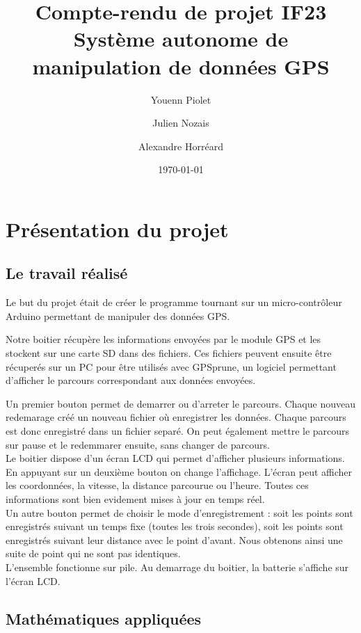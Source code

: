 \documentclass[a4paper,12pt,titlepage]{article}
\title{Compte-rendu de projet IF23\\Système autonome de manipulation de données GPS}
\author{Youenn Piolet \and Julien Nozais \and Alexandre Horréard}
\date{\today} %
\begin{document}
\maketitle

\tableofcontents

\newpage

\section{Présentation du projet}

\subsection{Le travail réalisé}

Le but du projet était de créer le programme tournant sur un micro-contrôleur Arduino permettant de manipuler des données GPS.

Notre boitier récupère les informations envoyées par le module GPS et les stockent sur une carte SD dans des fichiers. 
Ces fichiers peuvent ensuite être récuperés sur un PC pour être utilisés avec GPSprune, un logiciel permettant d'afficher
le parcours correspondant aux données envoyées.

\bigskip
Un premier bouton permet de demarrer ou d'arreter le parcours. Chaque nouveau redemarage créé un nouveau fichier où enregistrer les données.
Chaque parcours est donc enregistré dans un fichier separé. On peut également mettre le parcours sur pause et le redemmarer ensuite, sans changer de parcours.
\\
Le boitier dispose d'un écran LCD qui permet d'afficher plusieurs informations. En appuyant sur un deuxième bouton on change l'affichage.
L'écran peut afficher les coordonnées, la vitesse, la distance parcourue ou l'heure. Toutes ces informations sont bien evidement mises à jour en temps réel.
\\
Un autre bouton permet de choisir le mode d'enregistrement : soit les points sont enregistrés suivant un temps fixe (toutes les trois secondes),
soit les points sont enregistrés suivant leur distance avec le point d'avant. Nous obtenons ainsi une suite de point qui ne sont pas identiques.
\\
L'ensemble fonctionne sur pile. Au demarrage du boitier, la batterie s'affiche sur l'écran LCD.

\subsection{Mathématiques appliquées}
\end{document}
